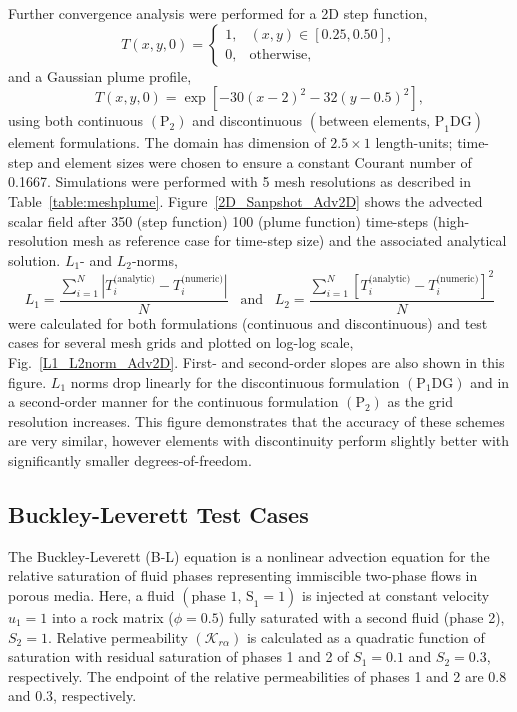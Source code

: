 \documentclass[preprint,authoryear,12pt]{elsarticle}
\begin{document}
Further convergence analysis were performed for a 2D step function,
\begin{displaymath}
T\left(x, y,0\right) =\begin{cases}
1, & \left(x,y\right)\in \left[0.25,0.50\right], \\%
0, & \text{otherwise,}
\end{cases}
\end{displaymath}
and a Gaussian plume profile,
\begin{displaymath}
T\left(x, y,0\right) = \exp{\left[-30\left(x-2\right)^{2}-32\left(y-0.5\right)^{2}\right]},
\end{displaymath}
using both continuous $\left(\text{P}_{2}\right)$ and discontinuous $\left(\text{between elements, P}_{1}\text{DG}\right)$ element formulations. The domain has dimension of $2.5\times 1$ length-units; time-step and element sizes were chosen to ensure a constant Courant number of 0.1667.  Simulations were performed with 5 mesh resolutions as described in Table~\ref{table:meshplume}. Figure~\ref{2D_Sanpshot_Adv2D} shows the advected scalar field after 350 (step function) 100 (plume function) time-steps (high-resolution mesh as reference case for time-step size) and the associated analytical solution. $L_{1}$- and $L_{2}$-norms,
\begin{displaymath}
L_{1}=\displaystyle\frac{\sum\limits_{i=1}^{N}\left|T_{i}^{\text{(analytic)}}-T_{i}^{\text{(numeric)}}\right|}{N}\;\;\;\text{and}\;\;\;L_{2}=\displaystyle\frac{\sum\limits_{i=1}^{N}\left[T_{i}^{\text{(analytic)}}-T_{i}^{\text{(numeric)}}\right]^{2}}{N}
\end{displaymath} 
were calculated for both formulations (continuous and discontinuous) and test cases for several mesh grids and plotted on log-log scale, Fig.~\ref{L1_L2norm_Adv2D}. First- and second-order slopes are also shown in this figure. $L_{1}$ norms drop linearly for the discontinuous formulation $\left(\text{P}_{1}\text{DG}\right)$ and in a second-order manner for the continuous formulation $\left(\text{P}_{2}\right)$ as the grid resolution increases. This figure demonstrates that the accuracy of these schemes are very similar, however elements with discontinuity perform slightly better with significantly smaller degrees-of-freedom. 

\subsection{Buckley-Leverett Test Cases}
The Buckley-Leverett (B-L) equation is a nonlinear advection equation for the relative saturation of fluid phases representing immiscible two-phase flows in porous media. Here, a fluid $\left(\text{phase 1, S}_{1}=1\right)$ is injected at constant velocity $u_{1}=1$ into a rock matrix ($\phi=0.5$) fully saturated with a second fluid (phase 2), $S_{2}=1$. Relative permeability $\left(\mathcal{K}_{r\alpha}\right)$ is calculated as a quadratic function of saturation with residual saturation of phases 1 and 2  of $S_{1}=0.1$ and $S_{2}=0.3$, respectively.  The endpoint of the relative permeabilities  of phases 1 and 2 are 0.8 and 0.3, respectively. 
\end{document}
